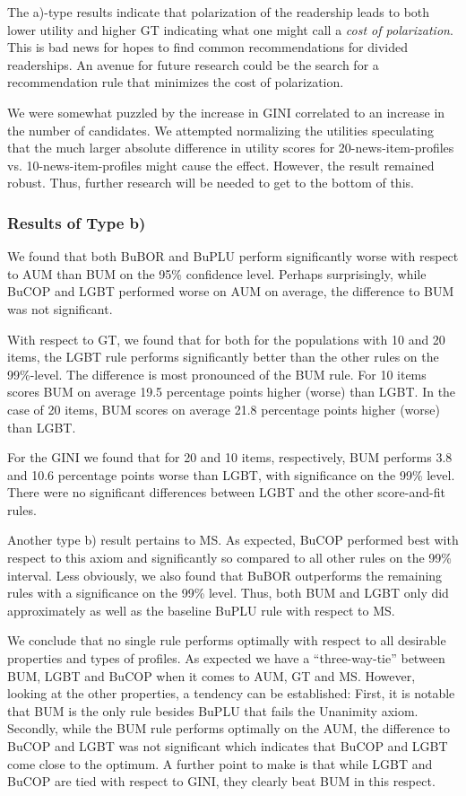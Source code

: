 \documentclass{article}
\begin{document}
The a)-type results indicate that polarization of the readership leads to both lower utility and higher GT indicating what one might call a \emph{cost of polarization}. This is bad news for hopes to find common recommendations for divided readerships. An avenue for future research could be the search for a recommendation rule that minimizes the cost of polarization.

We were somewhat puzzled by the increase in GINI correlated to an increase in the number of candidates. We attempted normalizing the utilities speculating that the much larger absolute difference in utility scores for 20-news-item-profiles vs. 10-news-item-profiles might cause the effect. However, the result remained robust. Thus, further research will be needed to get to the bottom of this.

\subsubsection{Results of Type b)}

We found that both BuBOR and BuPLU perform significantly worse with respect to AUM than BUM on the 95\% confidence level. Perhaps surprisingly, while BuCOP and LGBT performed worse on AUM on average, the difference to BUM was not significant.

With respect to GT, we found that for both for the populations with 10 and 20 items, the LGBT rule performs significantly better than the other rules on the 99\%-level. The difference is most pronounced of the BUM rule. For 10 items scores BUM on average 19.5 percentage points higher (worse) than LGBT. In the case of 20 items, BUM scores on average 21.8 percentage points higher (worse) than LGBT.

For the GINI we found that for 20 and 10 items, respectively, BUM performs 3.8 and 10.6 percentage points worse than LGBT, with significance on the 99\% level. There were no significant differences between LGBT and the other score-and-fit rules.

Another type b) result pertains to MS. As expected, BuCOP performed best with respect to this axiom and significantly so compared to all other rules on the 99\% interval. Less obviously, we also found that BuBOR outperforms the remaining rules with a significance on the 99\% level. Thus, both BUM and LGBT only did approximately as well as the baseline BuPLU rule with respect to MS.

We conclude that no single rule performs optimally with respect to all desirable properties and types of profiles. As expected we have a ``three-way-tie'' between BUM, LGBT and BuCOP when it comes to AUM, GT and MS. However, looking at the other properties, a tendency can be established:
First, it is notable that BUM is the only rule besides BuPLU that fails the Unanimity axiom. Secondly, while the BUM rule performs optimally on the AUM, the difference to BuCOP and LGBT was not significant which indicates that BuCOP and LGBT come close to the optimum. A further point to make is that while LGBT and BuCOP are tied with respect to GINI, they clearly beat BUM in this respect.
\end{document}
